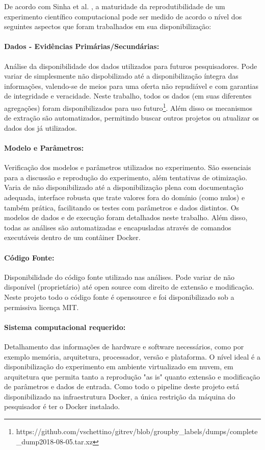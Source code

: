 \documentclass[sigconf]{acmart}
\begin{document}
De acordo com Sinha et al. \cite{sinha2016}, a maturidade da reprodutibilidade de um experimento científico computacional pode ser medido de acordo o nível dos seguintes aspectos que foram trabalhados em sua disponibilização:

\paragraph{Dados - Evidências Primárias/Secundárias:} Análise da disponibilidade dos dados utilizados para futuros pesquisadores. Pode variar de simplesmente não dispobilizado até a disponibilização íntegra das informações, valendo-se de meios para uma oferta não repudiável e com garantias de integridade e veracidade. Neste trabalho, todos os dados (em suas diferentes agregações) foram disponibilizados para uso futuro\footnote{https://github.com/vschettino/gitrev/blob/groupby\_labels/dumps/complete\_dump2018-08-05.tar.xz}. Além disso os mecanismos de extração são automatizados, permitindo buscar outros projetos ou atualizar os dados dos já utilizados.

\paragraph{Modelo e Parâmetros:} Verificação dos modelos e parâmetros utilizados no experimento. São essenciais para a discussão e reprodução do experimento, além tentativas de otimização. Varia de não disponibilizado até a disponibilização plena com documentação adequada, interface robusta que trate valores fora do domínio (como nulos) e também prática, facilitando os testes com parâmetros e dados distintos. Os modelos de dados e de execução foram detalhados neste trabalho. Além disso, todas as análises são automatizadas e encapusladas através de comandos executáveis dentro de um contâiner Docker.

\paragraph{Código Fonte:} Disponibilidade do código fonte utilizado nas análises. Pode variar de não disponível (proprietário) até open source com direito de extensão e modificação. Neste projeto todo o código fonte é opensource e foi disponibilizado sob a permissiva licença MIT.

\paragraph{Sistema computacional requerido:} Detalhamento das informações de hardware e software necessários, como por exemplo memória, arquitetura, processador, versão e plataforma. O nível ideal é a disponibilização do experimento em ambiente virtualizado em nuvem, em arquitetura que permita tanto a reprodução "as is" quanto extensão e modificação de parâmetros e dados de entrada. Como todo o pipeline deste projeto está disponibilizado na infraestrutura Docker, a única restrição da máquina do pesquisador é ter o Docker instalado.
\end{document}
